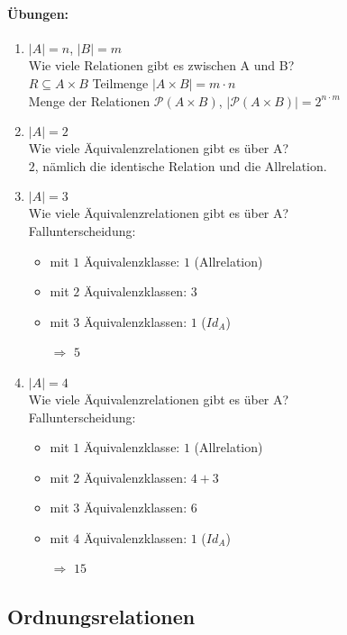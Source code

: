 \newpage
\paragraph{Übungen:}
\begin{enumerate}
\item $|A|=n$, $|B|=m$\\
Wie viele Relationen gibt es zwischen A und B?
\ \\
$R\subseteq A \times B$ Teilmenge $|A \times B| = m \cdot n$\\
Menge der Relationen $\mathcal{P}(A\times B)$, $|\mathcal{P}(A\times B)|=2^{n\cdot m}$
\item $|A|=2$\\
Wie viele Äquivalenzrelationen gibt es über A?
\ \\
$2$, nämlich die identische Relation und die Allrelation.
\item $|A|=3$\\
Wie viele Äquivalenzrelationen gibt es über A?
\ \\
Fallunterscheidung:
\begin{itemize}
\item mit $1$ Äquivalenzklasse: $1$ (Allrelation)
\item mit $2$ Äquivalenzklassen: $3$
\item mit $3$ Äquivalenzklassen: $1$ ($Id_A$)
\item[$\Rightarrow$] $5$
\end{itemize}
\item $|A|=4$\\
Wie viele Äquivalenzrelationen gibt es über A?
\ \\
Fallunterscheidung:
\begin{itemize}
\item mit $1$ Äquivalenzklasse: $1$ (Allrelation)
\item mit $2$ Äquivalenzklassen: $4+3$
\item mit $3$ Äquivalenzklassen: $6$
\item mit $4$ Äquivalenzklassen: $1$ ($Id_A$)
\item[$\Rightarrow$] $15$
\end{itemize}
\end{enumerate}

\subsection{Ordnungsrelationen}
